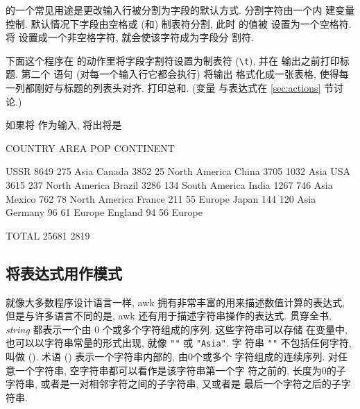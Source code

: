 \BEGIN 的一个常见用途是更改输入行被分割为字段的默认方式. 分割字符由一个内
建变量 \fs 控制. 默认情况下字段由空格或 (和) 制表符分割, 此时 \fs 的值被%
%
设置为一个空格符. 将 \fs 设置成一个非空格字符, 就会使该字符成为字段分
割符.

下面这个程序在 \BEGIN 的动作里将字段字割符设置为制表符 (\verb'\t'), 并在
输出之前打印标题. 第二个 \printf 语句 (对每一个输入行它都会执行) 将输出
格式化成一张表格, 使得每一列都刚好与标题的列表头对齐. \END 打印总和. (变量
与表达式在 \ref{sec:actions} 节讨论.)
如果将  作为输入, 将出将是
\begin{awkcode}
   COUNTRY   AREA   POP   CONTINENT

      USSR   8649   275   Asia
    Canada   3852    25   North America
     China   3705  1032   Asia
       USA   3615   237   North America
    Brazil   3286   134   South America
     India   1267   746   Asia
    Mexico    762    78   North America
    France    211    55   Europe
     Japan    144   120   Asia
   Germany     96    61   Europe
   England     94    56   Europe

     TOTAL  25681  2819
\end{awkcode}

\subsection{将表达式用作模式}
\label{subsec:expressions_as_patterns}

就像大多数程序设计语言一样, awk 拥有非常丰富的用来描述数值计算的表达式,
但是与许多语言不同的是, awk 还有用于描述字符串操作的表达式. 贯穿全书,
\textit{string} 都表示一个由 0 个或多个字符组成的序列. 这些字符串可以存储
在变量中, 也可以以字符串常量的形式出现, 就像 \verb'""' 或 \verb'"Asia"'.
字%
符串 \verb'""' 不包括任何字符, 叫做  ().
术语  () 表示一个字符串内部的, 由0个或多个
字符组成的连续序列. 对任意一个字符串, 空字符串都可以看作是该字符串第一个字
符之前的, 长度为0的子字符串, 或者是一对相邻字符之间的子字符串, 又或者是
最后一个字符之后的子字符串.

